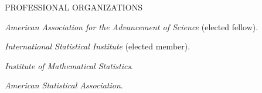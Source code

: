\lsp
\begin{mylist} {PROFESSIONAL ORGANIZATIONS}
\item {\it American Association for the Advancement of Science} (elected fellow). 
\item {\it International Statistical Institute} (elected member).
\item {\it Institute of Mathematical Statistics}.
\item {\it American Statistical Association}.
\end{mylist}

\lsp







